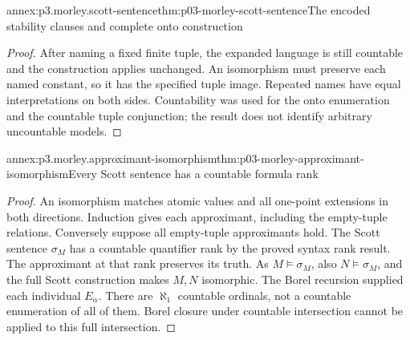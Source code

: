 \begin{annexitem}{annex:p3.morley.scott-sentence}{thm:p03-morley-scott-sentence}{The encoded stability clauses and complete onto construction}
\begin{proof}
After naming a fixed finite tuple, the expanded
language is still countable and the construction
applies unchanged. An isomorphism must preserve
each named constant, so it has the specified
tuple image. Repeated names have equal
interpretations on both sides.
Countability was used for the onto enumeration
and the countable tuple conjunction; the result
does not identify arbitrary uncountable models.
\end{proof}
\end{annexitem}

\begin{annexitem}{annex:p3.morley.approximant-isomorphism}{thm:p03-morley-approximant-isomorphism}{Every Scott sentence has a countable formula rank}
\begin{proof}
An isomorphism matches atomic values and all
one-point extensions in both directions.
Induction gives each approximant, including
the empty-tuple relations.
Conversely suppose all empty-tuple approximants
hold. The Scott sentence \(\sigma_M\) has a
countable quantifier rank by the proved syntax
rank result. The approximant at that rank
preserves its truth.
As \(M\models\sigma_M\), also \(N\models\sigma_M\),
and the full Scott construction makes \(M,N\)
isomorphic.
The Borel recursion supplied each individual
\(E_\alpha\). There are \(\aleph_1\) countable
ordinals, not a countable enumeration of all
of them. Borel closure under countable
intersection cannot be applied to this
full intersection.
\end{proof}
\end{annexitem}

